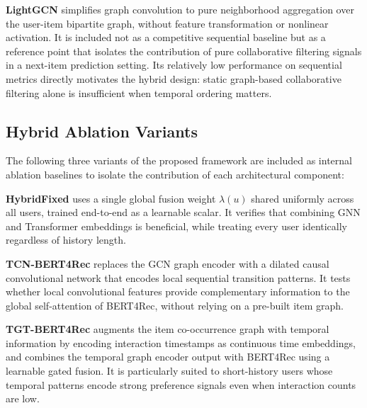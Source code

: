 \documentclass[12pt,a4paper]{report}
\begin{document}
\textbf{LightGCN} \citep{he2020lightgcn} simplifies graph convolution to pure
neighborhood aggregation over the user-item bipartite graph, without feature
transformation or nonlinear activation. It is included not as a competitive
sequential baseline but as a reference point that isolates the contribution of
pure collaborative filtering signals in a next-item prediction setting. Its
relatively low performance on sequential metrics directly motivates the hybrid
design: static graph-based collaborative filtering alone is insufficient when
temporal ordering matters.

\subsection*{Hybrid Ablation Variants}

The following three variants of the proposed framework are included as internal
ablation baselines to isolate the contribution of each architectural component:

\textbf{\mbox{HybridFixed}} uses a single global fusion weight \(\lambda(u)\) shared
uniformly across all users, trained end-to-end as a learnable scalar. It
verifies that combining GNN and Transformer embeddings is beneficial, while
treating every user identically regardless of history length.

\textbf{TCN-BERT4Rec} replaces the GCN graph encoder with a dilated causal
convolutional network that encodes local sequential transition patterns. It
tests whether local convolutional features provide complementary information
to the global self-attention of BERT4Rec, without relying on a pre-built item
graph.

\textbf{TGT-BERT4Rec} augments the item co-occurrence graph with temporal
information by encoding interaction timestamps as continuous time embeddings,
and combines the temporal graph encoder output with BERT4Rec using a learnable
gated fusion. It is particularly suited to short-history users whose temporal
patterns encode strong preference signals even when interaction counts are low.
\end{document}
